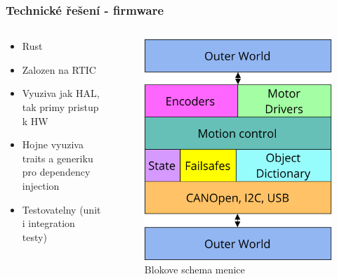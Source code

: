 \documentclass[%
  12pt,       				%
	t,                  %
	aspectratio=1610,   %
	unicode,						%
]{beamer}				    	%
\begin{document}
\begin{frame}
	\frametitle{Technické řešení - firmware}
	\begin{columns}[T] 								%
		\begin{column}{0.5\textwidth}		%
			\begin{itemize}
				\item Rust
				\item Zalozen na RTIC
				\item Vyuziva jak HAL, tak primy pristup k HW
				\item Hojne vyuziva traits a generiku pro dependency injection
				\item Testovatelny (unit i integration testy)
			\end{itemize}
		\end{column}
		\begin{column}{0.5\textwidth}		%
			\begin{figure}%
				\centering
				\includegraphics[width=0.7\columnwidth]{../Thesis/obrazky/firmware_arch}
				\caption{Blokove schema menice}%
				\label{fig:sm4_block}
			\end{figure}
		\end{column}
	\end{columns}
\end{frame}
\end{document}
